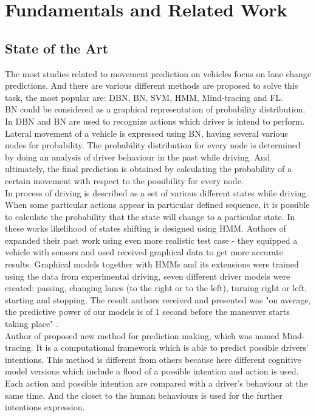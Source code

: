 \chapter{Fundamentals and Related Work}
\label{chap:1}
%
\section{State of the Art}

The most studies related to movement prediction on vehicles focus on lane change predictions. And there are various different methods are proposed to solve this task, the most popular are: \gls{DBN}, \gls{BN}, \gls{SVM}, \gls{HMM}, Mind-tracing and \gls{FL}. \\
\gls{BN} could be considered as a graphical representation of probability distribution. In \cite{BN1, BN2} \gls{DBN} and \gls{BN} are used to recognize actions which driver is intend to perform. Lateral movement of a vehicle is expressed using \gls{BN}, having several various nodes for probability. The probability distribution for every node is determined by doing an analysis of driver behaviour in the past while driving. And ultimately, the final prediction is obtained by calculating the probability of a certain movement with respect to the possibility for every node. \\
In \cite{Markov1, Markov2} process of driving is described as a set of various different states while driving. When some particular actions appear in particular defined sequence, it is possible to calculate the probability that the state will change to a particular state. In these works likelihood of states shifting is designed using \gls{HMM}. Authors of \cite{Markov3, Markov4} expanded their past work using even more realistic test case - they equipped a vehicle with sensors and used received graphical data to get more accurate results. Graphical models together with \glspl{HMM}  and its extensions were trained using the data from experimental driving,  seven different driver models were created: passing, changing lanes (to the right or to the left), turning right or left, starting and stopping. The result authors received and presented was "on average, the predictive power of our models is of 1 second before the maneuver starts taking place" \cite{Markov4}. \\
Author of \cite{Mind} proposed new method for prediction making, which was named Mind-tracing. It is a computational framework which is able to predict possible drivers' intentions. This method is different from others because here different cognitive model versions which include a flood of a possible intention and action is used. Each action and possible intention are compared with a driver's behaviour at the same time. And the closet to the human behaviours is used for the further intentions expression. \\
